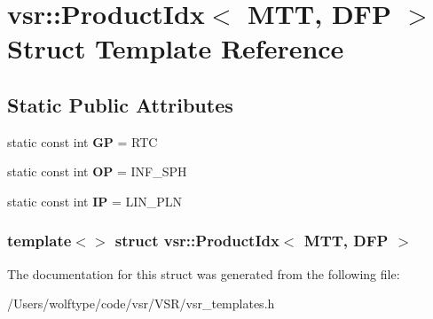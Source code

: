 \hypertarget{structvsr_1_1_product_idx_3_01_m_t_t_00_01_d_f_p_01_4}{\section{vsr\-:\-:Product\-Idx$<$ M\-T\-T, D\-F\-P $>$ Struct Template Reference}
\label{structvsr_1_1_product_idx_3_01_m_t_t_00_01_d_f_p_01_4}
}
\subsection*{Static Public Attributes}
\begin{DoxyCompactItemize}
\item 
\hypertarget{structvsr_1_1_product_idx_3_01_m_t_t_00_01_d_f_p_01_4_acd6a67dd444a18e8f3e638f59d18e8c7}{static const int {\bfseries G\-P} = R\-T\-C}\label{structvsr_1_1_product_idx_3_01_m_t_t_00_01_d_f_p_01_4_acd6a67dd444a18e8f3e638f59d18e8c7}

\item 
\hypertarget{structvsr_1_1_product_idx_3_01_m_t_t_00_01_d_f_p_01_4_a04bb4ee88df091b4343e33a26c075b8d}{static const int {\bfseries O\-P} = I\-N\-F\-\_\-\-S\-P\-H}\label{structvsr_1_1_product_idx_3_01_m_t_t_00_01_d_f_p_01_4_a04bb4ee88df091b4343e33a26c075b8d}

\item 
\hypertarget{structvsr_1_1_product_idx_3_01_m_t_t_00_01_d_f_p_01_4_a73301d79704b2e3204e163aa1eb911e1}{static const int {\bfseries I\-P} = L\-I\-N\-\_\-\-P\-L\-N}\label{structvsr_1_1_product_idx_3_01_m_t_t_00_01_d_f_p_01_4_a73301d79704b2e3204e163aa1eb911e1}

\end{DoxyCompactItemize}
\subsubsection*{template$<$$>$ struct vsr\-::\-Product\-Idx$<$ M\-T\-T, D\-F\-P $>$}



The documentation for this struct was generated from the following file\-:\begin{DoxyCompactItemize}
\item 
/\-Users/wolftype/code/vsr/\-V\-S\-R/vsr\-\_\-templates.\-h\end{DoxyCompactItemize}
